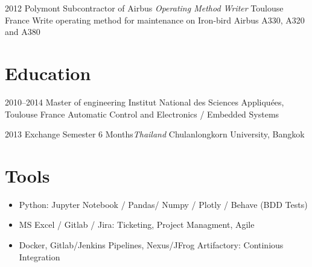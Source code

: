 \documentclass[a4paper]{friggeri-cv} %
\begin{document}
\begin{entrylist}
\entry
{2012}
{Polymont Subcontractor of Airbus \textit{Operating Method Writer}}
{Toulouse France}
{ Write operating method for maintenance on Iron-bird Airbus A330, A320 and A380 }


\end{entrylist}


\section{Education}
\begin{entrylist}

 \entry
{2010--2014}
{Master of engineering}
{Institut National des Sciences Appliquées, Toulouse France}
{Automatic Control and Electronics / Embedded Systems}


\entry
{2013}
{Exchange Semester 6 Months\textit{Thailand}}
{Chulanlongkorn University, Bangkok}
{}



\end{entrylist}



\section{Tools}

\begin{itemize}
\item Python: Jupyter Notebook / Pandas/ Numpy / Plotly / Behave (BDD Tests)
\item MS Excel / Gitlab / Jira: Ticketing, Project Managment, Agile 
\item Docker, Gitlab/Jenkins Pipelines, Nexus/JFrog Artifactory:  Continious Integration
\end{itemize}
\end{document}
